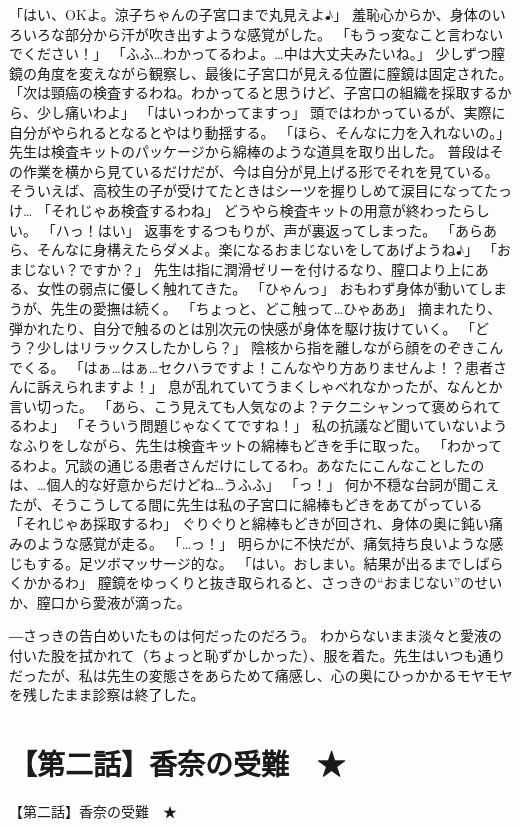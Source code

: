 「はい、OKよ。涼子ちゃんの子宮口まで丸見えよ♪」
羞恥心からか、身体のいろいろな部分から汗が吹き出すような感覚がした。
「もうっ変なこと言わないでください！」
「ふふ…わかってるわよ。…中は大丈夫みたいね。」
少しずつ膣鏡の角度を変えながら観察し、最後に子宮口が見える位置に膣鏡は固定された。
「次は頸癌の検査するわね。わかってると思うけど、子宮口の組織を採取するから、少し痛いわよ」
「はいっわかってますっ」
頭ではわかっているが、実際に自分がやられるとなるとやはり動揺する。
「ほら、そんなに力を入れないの。」
先生は検査キットのパッケージから綿棒のような道具を取り出した。
普段はその作業を横から見ているだけだが、今は自分が見上げる形でそれを見ている。
そういえば、高校生の子が受けてたときはシーツを握りしめて涙目になってたっけ…
「それじゃあ検査するわね」
どうやら検査キットの用意が終わったらしい。
「ハっ！はい」
返事をするつもりが、声が裏返ってしまった。
「あらあら、そんなに身構えたらダメよ。楽になるおまじないをしてあげようね♪」
「おまじない？ですか？」
先生は指に潤滑ゼリーを付けるなり、膣口より上にある、女性の弱点に優しく触れてきた。
「ひゃんっ」
おもわず身体が動いてしまうが、先生の愛撫は続く。
「ちょっと、どこ触って…ひゃああ」
摘まれたり、弾かれたり、自分で触るのとは別次元の快感が身体を駆け抜けていく。
「どう？少しはリラックスしたかしら？」
陰核から指を離しながら顔をのぞきこんでくる。
「はぁ…はぁ…セクハラですよ！こんなやり方ありませんよ！？患者さんに訴えられますよ！」
息が乱れていてうまくしゃべれなかったが、なんとか言い切った。
「あら、こう見えても人気なのよ？テクニシャンって褒められてるわよ」
「そういう問題じゃなくてですね！」
私の抗議など聞いていないようなふりをしながら、先生は検査キットの綿棒もどきを手に取った。
「わかってるわよ。冗談の通じる患者さんだけにしてるわ。あなたにこんなことしたのは、…個人的な好意からだけどね…うふふ」
「っ！」
何か不穏な台詞が聞こえたが、そうこうしてる間に先生は私の子宮口に綿棒もどきをあてがっている
「それじゃあ採取するわ」
ぐりぐりと綿棒もどきが回され、身体の奥に鈍い痛みのような感覚が走る。
「…っ！」
明らかに不快だが、痛気持ち良いような感じもする。足ツボマッサージ的な。
「はい。おしまい。結果が出るまでしばらくかかるわ」
膣鏡をゆっくりと抜き取られると、さっきの“おまじない”のせいか、膣口から愛液が滴った。

―さっきの告白めいたものは何だったのだろう。
わからないまま淡々と愛液の付いた股を拭かれて（ちょっと恥ずかしかった）、服を着た。先生はいつも通りだったが、私は先生の変態さをあらためて痛感し、心の奥にひっかかるモヤモヤを残したまま診察は終了した。


\section{【第二話】香奈の受難　★}
【第二話】香奈の受難　★


